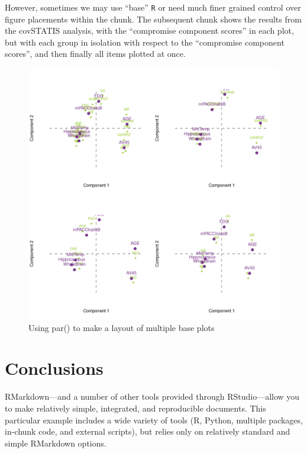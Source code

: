 \documentclass[]{article}
\begin{document}
However, sometimes we may use ``base'' \texttt{R} or need much finer
grained control over figure placements within the chunk. The subsequent
chunk shows the results from the covSTATIS analysis, with the
``compromise component scores'' in each plot, but with each group in
isolation with respect to the ``compromise component scores'', and then
finally all items plotted at once.

\begin{figure}[H]

{\centering \includegraphics{1_b_Simple_RMarkdown_PDF_files/figure-latex/unnamed-chunk-3-1} 

}

\caption{Using par() to make a layout of multiple base plots}\label{fig:unnamed-chunk-3}
\end{figure}

\hypertarget{conclusions}{%
\section{Conclusions}\label{conclusions}}

RMarkdown---and a number of other tools provided through RStudio---allow
you to make relatively simple, integrated, and reproducible documents.
This particular example includes a wide variety of tools (R, Python,
multiple packages, in-chunk code, and external scripts), but relies only
on relatively standard and simple RMarkdown options.
\end{document}
